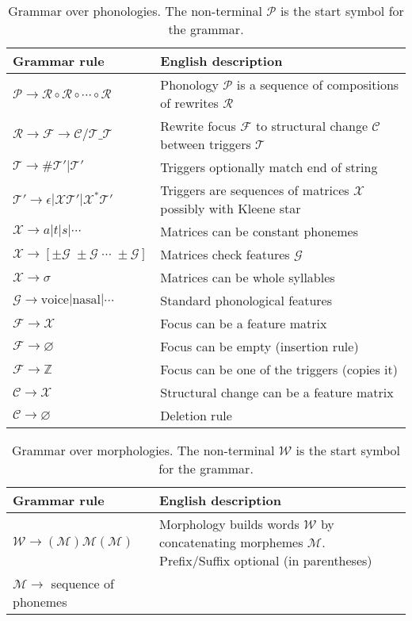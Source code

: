\documentclass{article}
\begin{document}
\begin{table*}[h]
\centering
\begin{tabular*}{\textwidth}{ll}
\toprule
Grammar rule  & English description \\\midrule
$\mathcal{P}\to \mathcal{R}\circ \mathcal{R}\circ \cdots \circ \mathcal{R}$&Phonology $\mathcal{P}$ is a sequence of compositions of rewrites $\mathcal{R}$\\
$\mathcal{R}\to \mathcal{F}\longrightarrow \mathcal{C} / \mathcal{T}\_\mathcal{T}$& Rewrite focus $\mathcal{F}$ to structural change $\mathcal{C}$ between triggers $\mathcal{T}$\\
$\mathcal{T}\to \# \mathcal{T}' | \mathcal{T}'$ & Triggers optionally match end of string\\
$\mathcal{T}'\to \epsilon | \mathcal{X} \mathcal{T}' | \mathcal{X}^* \mathcal{T}'$ & Triggers are sequences of matrices $\mathcal{X}$ possibly with Kleene star\\
$\mathcal{X}\to a|t|s|\cdots$&Matrices can be constant phonemes\\
$\mathcal{X}\to [\pm \mathcal{G} \; \pm \mathcal{G} \; \cdots \; \pm \mathcal{G}]$& Matrices check features $\mathcal{G}$\\
$\mathcal{X}\to \sigma$&Matrices can be whole syllables\\
$\mathcal{G}\to \text{voice}|\text{nasal}|\cdots$&Standard phonological features\\
$\mathcal{F}\to \mathcal{X}$&Focus can be a feature matrix\\
$\mathcal{F}\to \varnothing$&Focus can be empty (insertion rule)\\
$\mathcal{F}\to\mathbb{Z}$&Focus can be one of the triggers (copies it)\\
$\mathcal{C}\to\mathcal{X}$&Structural change can be a feature matrix\\
$\mathcal{C}\to\varnothing$&Deletion rule\\
\bottomrule
\end{tabular*}
\caption{Grammar over phonologies. The non-terminal $\mathcal{P}$ is the start symbol for the grammar.}
\label{phonologyGrammar}
\end{table*}

\begin{table*}[h]
\centering
\begin{tabular*}{\textwidth}{ll}
\toprule
Grammar rule  & English description \\\midrule
$\mathcal{W}\to (\mathcal{M}) \mathcal{M} (\mathcal{M})$&Morphology builds words $\mathcal{W}$ by concatenating morphemes $\mathcal{M}$. Prefix/Suffix optional (in parentheses)\\
$\mathcal{M}\to$ sequence of phonemes\bottomrule
\end{tabular*}
\caption{Grammar over morphologies. The non-terminal $\mathcal{W}$ is the start symbol for the grammar.}
\label{morphologyGrammar}
\end{table*}
\end{document}
